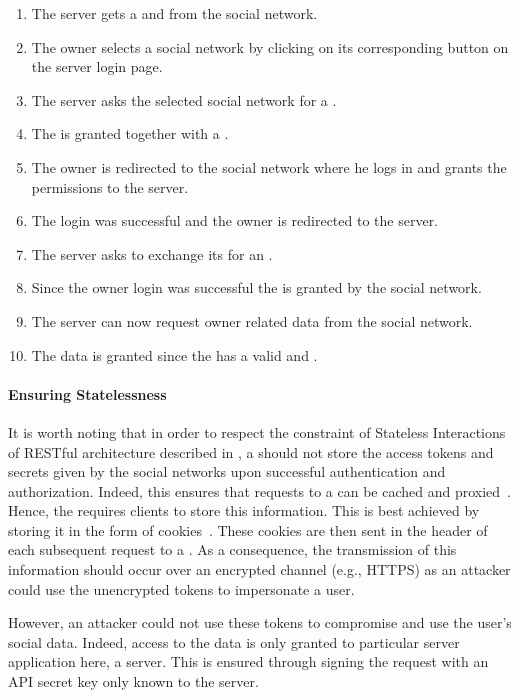 \begin{enumerate}
 \setcounter{enumi}{0}
 \item The \sac{} server gets a  and  from the social network.
 \item The owner selects a social network by clicking on its corresponding button on the \sac{} server login page.
 \item The \sac{} server asks the selected social network for a .
 \item The  is granted together with a .
 \item The owner is redirected to the social network where he logs in and grants the permissions to the \sac{} server.
 \item The login was successful and the owner is redirected to the \sac{} server.
 \item The \sac{} server asks to exchange its  for an .
 \item Since the owner login was successful the  is granted by the social network.
 \item The \sac{} server can now request owner related data from the social network.
  \item The data is granted since the \sac{} has a valid  and .
\end{enumerate}

\paragraph{Ensuring Statelessness}
It is worth noting that in order to respect the constraint of Stateless Interactions of RESTful architecture described in , a \sac{} should not store the access tokens and secrets given by the social networks upon successful authentication and authorization. Indeed, this ensures that requests to a \sac{} can be cached and proxied~\cite{Richardson2007}. Hence, the \sac{} requires clients to store this information. This is best achieved by storing it in the form of cookies~\cite{Kristol1997-cookies}. These cookies are then sent in the header of each subsequent request to a \sac{}. As a consequence, the transmission of this information should occur over an encrypted channel (e.g., HTTPS) as an attacker could use the unencrypted tokens to impersonate a user.

However, an attacker could not use these tokens to compromise and use the user's social data. Indeed, access to the data is only granted to particular server application here, a \sac{} server. This is ensured through signing the request with an API secret key only known to the \sac{} server.



